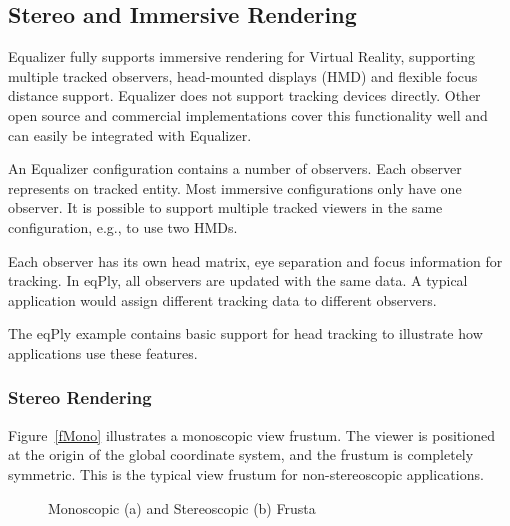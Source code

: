\documentclass[10pt,a4]{scrartcl}
\newcommand{\fig}[1]{Figure~\ref{#1}}
\begin{document}
\subsection{\label{sTracking}Stereo and Immersive Rendering}

Equalizer fully supports immersive rendering for Virtual Reality, supporting
multiple tracked observers, head-mounted displays (HMD) and flexible focus
distance support. Equalizer does not support tracking devices directly. Other
open source and commercial implementations cover this functionality well
and can easily be integrated with Equalizer.

An Equalizer configuration contains a number of observers. Each observer
represents on tracked entity. Most immersive configurations only have one
observer. It is possible to support multiple tracked viewers in the same
configuration, e.g., to use two HMDs.

Each observer has its own head matrix, eye separation and focus information for
tracking. In \textsf{eqPly}, all observers are updated with the same data. A
typical application would assign different tracking data to different observers.

The \textsf{eqPly} example contains basic support for head tracking to
illustrate how applications use these features.

\subsubsection{Stereo Rendering}

\fig{fMono} illustrates a monoscopic view frustum. The viewer is
positioned at the origin of the global coordinate system, and the
frustum is completely symmetric. This is the typical view frustum for
non-stereoscopic applications.

\begin{figure}[h!t]\center
  \hfil
  {\caption{Monoscopic (a) and Stereoscopic (b) Frusta}}
\end{figure}
\end{document}
